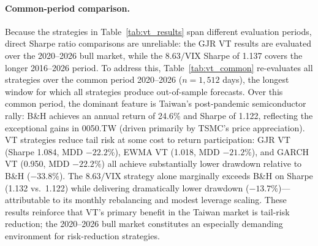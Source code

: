 \paragraph{Common-period comparison.} Because the strategies in Table~\ref{tab:vt_results} span different evaluation periods, direct Sharpe ratio comparisons are unreliable: the GJR VT results are evaluated over the 2020--2026 bull market, while the $8.63/\text{VIX}$ Sharpe of 1.137 covers the longer 2016--2026 period. To address this, Table~\ref{tab:vt_common} re-evaluates all strategies over the common period 2020--2026 ($n = 1{,}512$ days), the longest window for which all strategies produce out-of-sample forecasts. Over this common period, the dominant feature is Taiwan's post-pandemic semiconductor rally: B\&H achieves an annual return of 24.6\% and Sharpe of 1.122, reflecting the exceptional gains in 0050.TW (driven primarily by TSMC's price appreciation). VT strategies reduce tail risk at some cost to return participation: GJR VT (Sharpe 1.084, MDD $-22.2\%$), EWMA VT (1.018, MDD $-21.2\%$), and GARCH VT (0.950, MDD $-22.2\%$) all achieve substantially lower drawdown relative to B\&H ($-33.8\%$). The $8.63/\text{VIX}$ strategy alone marginally exceeds B\&H on Sharpe (1.132 vs.\ 1.122) while delivering dramatically lower drawdown ($-13.7\%$)---attributable to its monthly rebalancing and modest leverage scaling. These results reinforce that VT's primary benefit in the Taiwan market is tail-risk reduction; the 2020--2026 bull market constitutes an especially demanding environment for risk-reduction strategies.

